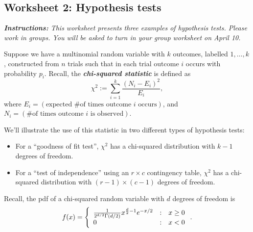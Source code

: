 \documentclass[10pt]{amsart}
\theoremstyle{definition}
\newcommand{\1}[1]{\textbf{1}_{\left[#1\right]}} %
\newcommand{\dempfcolor}[1]{{\color{RoyalBlue}#1}}
\newcommand{\demph}[1]{\dempfcolor{\textbf{\textit{#1}}}}
\begin{document}
\begin{center}
  \section*{Worksheet 2: Hypothesis tests}
\end{center}

\textit{\textbf{Instructions:} This worksheet presents three examples of
  hypothesis tests. Please work in groups. You will be asked to turn in your
  group worksheet on April 10.}



\phantom{don't write in starlight, cause the words may come out real}
\begin{center}
  \begin{tcolorbox}[ width=1\textwidth, colback=white, colframe=black,
    title=Background on chi-squared statistic, colbacktitle=blue!15,
    coltitle=black ]
    Suppose we have a multinomial random variable with $k$ outcomes, labelled
    $1,\ldots,k$, constructed from $n$ trials such that in each trial outcome
    $i$ occurs with probability $p_{i}$. Recall, the \demph{chi-squared
      statistic} is defined as
    \begin{equation*}
      \chi^{2}:= \sum_{i=1}^{k} \frac{\left(N_{i}-E_{i}\right)^{2}}{E_{i}},
    \end{equation*}
    where $E_{i} = (\text{expected \# of times outcome $i$ occurs})$, and
    $N_{i}= (\text{\# of times outcome $i$ is observed})$.

    We'll illustrate the use of this statistic in two different types of
    hypothesis tests:
    \begin{itemize}
      \item For a ``goodness of fit test'', $\chi^{2}$ has a chi-squared
      distribution with $k-1$ degrees of freedom.
      \item For a ``test of independence'' using an $r\times c$ contingency
      table, $\chi^{2}$ has a chi-squared distribution with $(r-1)\times(c-1)$
      degrees of freedom.
    \end{itemize}

    Recall, the pdf of a chi-squared random variable with $d$ degrees of
    freedom is
    \begin{equation*}
      f(x) = \left\{ \begin{array}{l@{\quad:\quad}l} \frac{1}{2^{d/2}\Gamma(d/2)}x^{\frac{d}{2}-1}e^{-x/2} & x \geq 0\\ 0& x<0\end{array}\right..
    \end{equation*}
  \end{tcolorbox}
\end{center}
\end{document}
